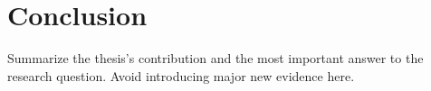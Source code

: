 \chapter{Conclusion}

Summarize the thesis's contribution and the most important answer to the
research question. Avoid introducing major new evidence here.
